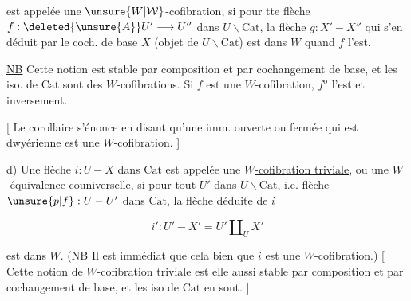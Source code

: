 
est appelée une $\unsure{W|\mathcal W}$-cofibration, si pour tte flèche $f:\deleted{\unsure{A}}U'\longrightarrow U''$ dans $U\backslash\mathrm{Cat}$, la flèche $g:X'\mathbin{-}X''$ qui s'en déduit par le coch. de base  $X$ (objet de $U\backslash\mathrm{Cat}$) est dans $W$ quand $f$ l'est.

\uline{NB} Cette notion  est stable par composition et par cochangement de base, et les iso. de $\mathrm{Cat}$ sont des $W$-cofibrations. Si $f$ est une $W$-cofibration, $f^{\mathrm o}$ l'est et inversement.

[ Le corollaire s'énonce en disant qu'une imm. ouverte ou fermée qui est dwyérienne est une $W$-cofibration. ]

d) Une flèche $i:U\mathbin{-}X$ dans $\mathrm{Cat}$ est appelée une \uline{$W$-cofibration triviale}, ou une $W$-\uline{équivalence couniverselle}, si pour tout $U'$ dans $U\backslash\mathrm{Cat}$, i.e.  flèche $\unsure{p|f}:U\mathbin{-}U'$ dans $\mathrm{Cat}$, la flèche déduite de $i$

\[
i':U'\mathbin{-}X'=U'\amalg_{U}X'
\]

est dans $W$. (NB Il est immédiat que cela  bien que $i$ est une $W$-cofibration.) [ Cette notion de $W$-cofibration triviale est elle aussi stable par composition et par cochangement de base, et les iso de $\mathrm{Cat}$ en sont. ]
